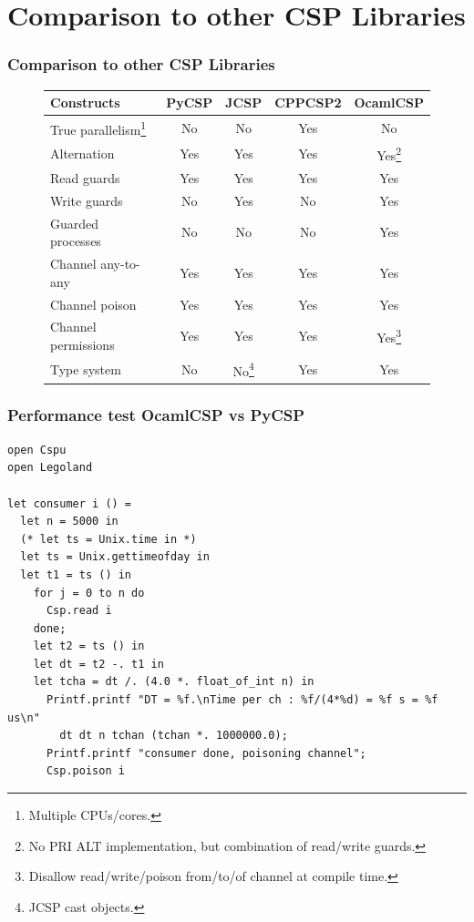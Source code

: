 \documentclass{beamer}
\begin{document}
\section[Comparison]{Comparison to other CSP Libraries}
\begin{frame}
  \frametitle{Comparison to other CSP Libraries}
  \begin{figure}[h]
    \centering
    \begin{tabular}{l|c|c|c|c}
      Constructs & PyCSP & JCSP & CPPCSP2 & OcamlCSP \\
      \hline
       True parallelism\footnote{Multiple CPUs/cores.} & No & No & Yes & No \\
       Alternation & Yes & Yes & Yes & Yes\footnote{No PRI ALT implementation,
         but combination of read/write guards.} \\
       Read guards & Yes & Yes & Yes & Yes \\
       Write guards & No & Yes & No & Yes \\
       Guarded processes & No & No & No & Yes \\
       Channel any-to-any & Yes & Yes & Yes & Yes \\
       Channel poison & Yes & Yes & Yes & Yes \\
       Channel permissions & Yes & Yes & Yes & Yes\footnote{Disallow
         read/write/poison from/to/of channel at compile time.} \\
       Type system & No & No\footnote{JCSP cast objects.} & Yes & Yes \\
    \end{tabular}
  \end{figure}
\end{frame}

\begin{frame}[fragile]
  \frametitle{Performance test OcamlCSP vs PyCSP}
  \tiny
\begin{verbatim}
open Cspu
open Legoland

let consumer i () =
  let n = 5000 in
  (* let ts = Unix.time in *)
  let ts = Unix.gettimeofday in
  let t1 = ts () in
    for j = 0 to n do
      Csp.read i
    done;
    let t2 = ts () in
    let dt = t2 -. t1 in
    let tcha = dt /. (4.0 *. float_of_int n) in
      Printf.printf "DT = %f.\nTime per ch : %f/(4*%d) = %f s = %f us\n"
        dt dt n tchan (tchan *. 1000000.0);
      Printf.printf "consumer done, poisoning channel";
      Csp.poison i
\end{verbatim}
  \normalsize
\end{frame}
\end{document}
